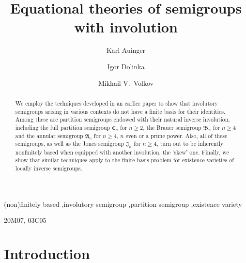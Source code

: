 \documentclass[preprint,1p,times]{elsarticle}
\numberwithin{equation}{section}
\theoremstyle{remark}
\def\A{\mathfrak{A}}
\def\C{\mathfrak{C}}
\def\B{\mathfrak{B}}
\def\J{\mathfrak{J}}
\begin{document}
\begin{frontmatter}

\title{Equational theories of semigroups with involution}

\author[ka]{Karl Auinger}
\author[id]{Igor Dolinka}
\author[mvv]{Mikhail V.\ Volkov}


\address[ka]{Fakult\"at f\"ur Mathematik, Universit\"at Wien, Nordbergstrasse 15,  A-1090 Wien, Austria}
\address[id]{Department of Mathematics and Informatics, University of Novi Sad, Trg Dositeja Obradovi\'ca 4,
21000 Novi Sad, Serbia}
\address[mvv]{Faculty of Mathematics and Mechanics, Ural State University, Lenina 51, 620083 Ekaterinburg, Russia}

\begin{abstract}
We employ the techniques developed in an earlier paper to show that involutory semigroups arising in various contexts
do not have a finite basis for their identities. Among these are partition semigroups endowed with their natural
inverse involution, including the full partition semigroup $\C_n$ for $n\ge 2$, the Brauer semigroup $\B_n$ for $n\ge 4$ and
the annular semigroup $\A_n$ for $n\ge 4$, $n$ even or a prime power. Also, all of these semigroups, as well as the Jones
semigroup $\J_n$ for $n\ge 4$, turn out to be inherently nonfinitely based when equipped with another involution, the
`skew' one. Finally, we show that similar techniques apply to the finite basis problem for existence varieties of
locally inverse semigroups.
\end{abstract}

\begin{keyword}
(non)finitely based \sep involutory semigroup \sep partition semigroup \sep existence variety

\MSC[2010] 20M07, 03C05
\end{keyword}

\end{frontmatter}

\section*{Introduction}
\end{document}
